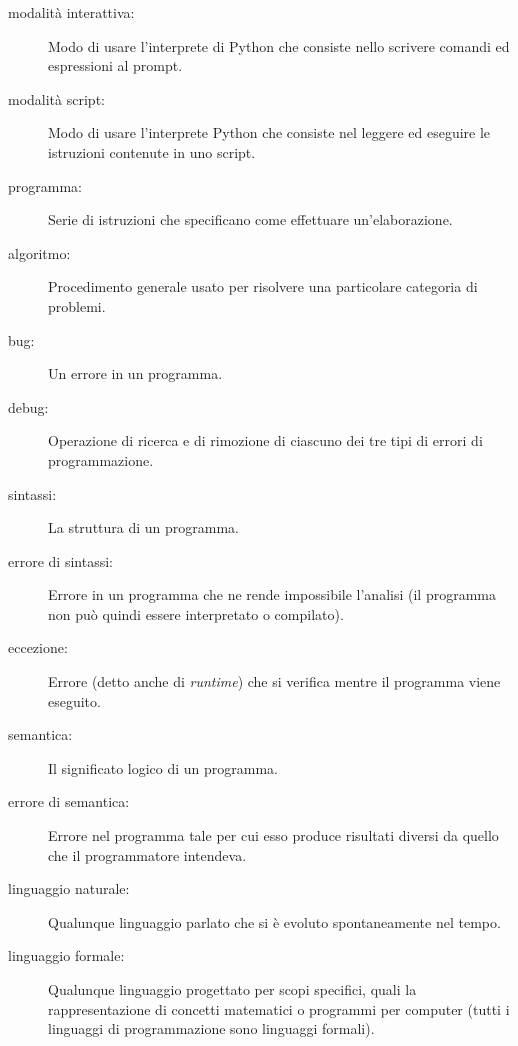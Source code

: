 \documentclass[10pt]{book}
\begin{document}
\begin{description}
\item[modalità interattiva:] Modo di usare l'interprete di Python che consiste nello scrivere comandi ed espressioni al prompt.

\item[modalità script:] Modo di usare l'interprete Python che consiste nel leggere ed eseguire le istruzioni contenute in uno script.

\item[programma:] Serie di istruzioni che specificano come effettuare          un'elaborazione.

\item[algoritmo:]  Procedimento generale usato per risolvere una particolare categoria di problemi.

\item[bug:]  Un errore in un programma.

\item[debug:]  Operazione di ricerca e di rimozione di ciascuno dei tre tipi di errori di programmazione.

\item[sintassi:]  La struttura di un programma.

\item[errore di sintassi:]  Errore in un programma che ne rende impossibile l'analisi (il programma non può quindi essere interpretato o compilato).

\item[eccezione:]  Errore (detto anche di {\em runtime}) che si verifica mentre il programma viene eseguito.

\item[semantica:]  Il significato logico di un programma.

\item[errore di semantica:]   Errore nel programma tale per cui esso produce risultati diversi da quello che il programmatore intendeva.

\item[linguaggio naturale:]  Qualunque linguaggio parlato che si è evoluto spontaneamente nel tempo.

\item[linguaggio formale:]  Qualunque linguaggio progettato per scopi specifici, quali la rappresentazione di concetti matematici o programmi per computer (tutti i linguaggi di programmazione sono linguaggi formali).


\end{description}
\end{document}
